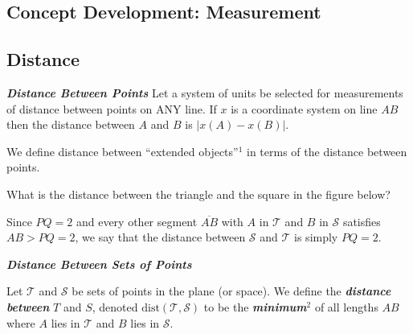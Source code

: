 \documentclass{tufte-handout}
\newcommand{\uv}{\vspace{.1in}}
\begin{document}
\begin{tcolorbox}[enhanced jigsaw,breakable,pad at break*=1mm,
  colback=cyan!2!white,colframe=blue!75!black,title=Student View: Slide 10,drop fuzzy shadow,watermark color=white,watermark text=\arabic{tcbbreakpart}]
  \section{Concept Development: Measurement}\subsection{Distance}
\begin{tcolorbox}[colback=blue!4]

 \textbf{\textit{Distance Between Points}} Let a system of units be selected for measurements of distance between points on ANY line. If $x$ is a coordinate system on line $AB$ then the distance between $A$ and $B$ is $|x(A)-x(B)|.$
\end{tcolorbox}

\uv We define distance between ``extended objects''$^1$ in terms of the distance between points. 

\uv {} What is the distance between the triangle and the square in the figure below?
\begin{center}
\end{center}

Since $\displaystyle{PQ=2}$ and every other segment $\overline{AB}$ with $A$ in $\mathcal{T}$ and $B$ in $\mathcal{S}$ satisfies $\displaystyle{AB>PQ=2}$, we say that the distance between $\mathcal{S}$ and $\mathcal{T}$ is simply $\displaystyle{PQ=2}$. 

\uv\begin{tcolorbox}[colback=blue!4]
 \textbf{\textit{Distance Between Sets of Points}}

\uv Let $\mathcal{T}$ and $\mathcal{S}$ be sets of points in the plane (or space). We define the \textbf{\textit{distance between }} $T$ and $S$, denoted $\text{dist}(\mathcal{T},\mathcal{S})$ to be the \textbf{\textit{minimum}}$^2$ of all lengths $AB$ where $A$ lies in $\mathcal{T}$ and $B$ lies in $\mathcal{S}.$

\end{tcolorbox}
  
  
 
\end{tcolorbox}
\end{document}
